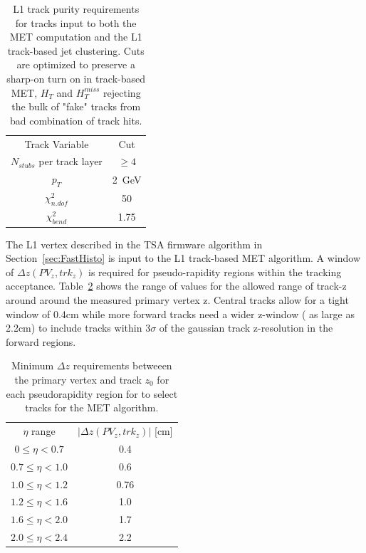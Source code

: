 \begin{table}[h]
\begin{tabular}{|c|c|}
Track Variable & Cut\\
$N_{stubs}$ per track layer&$\geq 4$ \\
$p_{T}$ & 2~GeV \\
$\chi^{2}_{n.dof}$ & 50 \\
$\chi^{2}_{bend}$  & 1.75 \\

\end{tabular}
\caption{ L1 track purity requirements for tracks input to both the MET computation and the L1 track-based jet clustering. Cuts are optimized to preserve a sharp-on turn on in track-based MET, $H_{T}$ and $H^{miss}_{T}$ rejecting the bulk of "fake" tracks from bad combination of track hits.}
\label{tab:trkpurity}
\end{table}

The L1 vertex described in the TSA firmware algorithm in Section~\ref{sec:FastHisto} is input to the L1 track-based MET algorithm. A window of $\Delta z\left(PV_{z}, trk_{z}\right)$ is required for pseudo-rapidity regions within the tracking acceptance. Table~\ref{tab:zwindows} shows the range of values for the allowed range of track-z around around the measured primary vertex z. Central tracks allow for a tight window of 0.4cm while more forward tracks need a wider z-window ( as large as 2.2cm) to include tracks within $3\sigma$ of the gaussian track z-resolution in the forward regions.
\begin{table}[h]
\begin{tabular}{|c|c|}
$\eta$ range & $\vert \Delta z\left(PV_{z}, trk_{z}\right) \vert$  [cm] \\
 $0\leq \eta < 0.7$ & 0.4\\
$0.7\leq \eta <1.0 $& 0.6\\
$1.0\leq \eta < 1.2 $ & 0.76\\
$1.2\leq \eta < 1.6$ & 1.0 \\
$1.6\leq \eta <  2.0 $& 1.7 \\
$2.0\leq  \eta < 2.4 $ & 2.2 \\
\end{tabular}
\caption{Minimum $\Delta z $ requirements betweeen the primary vertex and track $z_{0}$ for each pseudorapidity region for to select tracks for the MET algorithm. }
\label{tab:zwindows}
\end{table}

